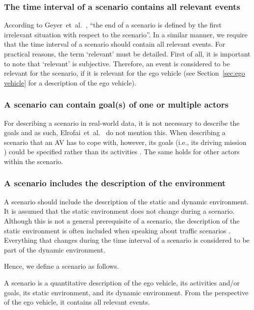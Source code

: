 \subsubsection{The time interval of a scenario contains all relevant events}
According to Geyer~et~al.~\cite{geyer2014}, ``the end of a scenario is defined by the first irrelevant situation with respect to the scenario''. In a similar manner, we require that the time interval of a scenario should contain all relevant events. For practical reasons, the term `relevant' must be detailed. First of all, it is important to note that `relevant' is subjective. Therefore, an event is considered to be relevant for the scenario, if it is relevant for the ego vehicle (see Section~\ref{sec:ego vehicle} for a description of the ego vehicle).

\subsubsection{A scenario can contain goal(s) of one or multiple actors}
For describing a scenario in real-world data, it is not necessary to describe the goals and as such, Elrofai~et~al.~\cite{elrofai2016scenario} do not mention this. When describing a scenario that an AV has to cope with, however, its goals (i.e., its driving mission \cite{geyer2014}) could be specified rather than its activities \cite{ulbrich2015}. The same holds for other actors within the scenario.
	
\subsubsection{A scenario includes the description of the environment}
A scenario should include the description of the static and dynamic environment. It is assumed that the static environment does not change during a scenario. Although this is not a general prerequisite of a scenario, the description of the static environment is often included when speaking about traffic scenarios \cite{geyer2014, ulbrich2015, elrofai2016scenario, ebner2011identifying, schuldt2013effiziente, althoff2017CommonRoad}. Everything that changes during the time interval of a scenario is considered to be part of the dynamic environment. 

Hence, we define a scenario as follows.
\begin{definition}[Scenario]\label{def:scenario}
	A scenario is a quantitative description of the ego vehicle, its activities and/or goals, its static environment, and its dynamic environment. From the perspective of the ego vehicle, it contains all relevant events.
\end{definition}

